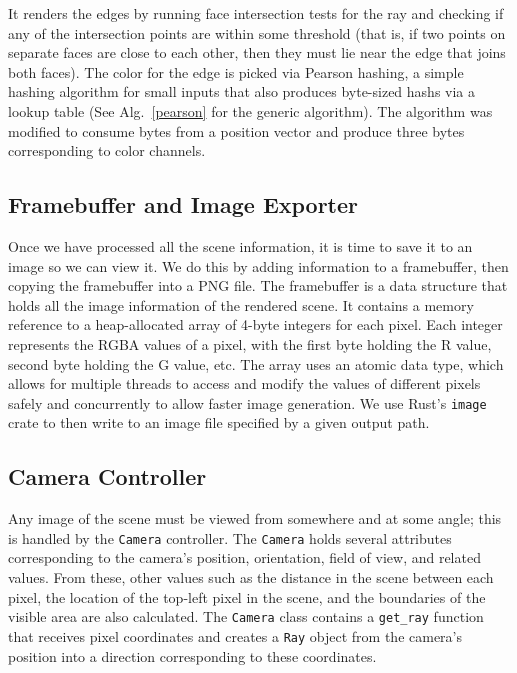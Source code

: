 \documentclass[conference]{IEEEtran}
\begin{document}
It renders the edges by running face intersection tests for the ray and checking if any of the intersection points are within some threshold (that is, if two points on separate faces are close to each other, then they must lie near the edge that joins both faces).
The color for the edge is picked via Pearson hashing, a simple hashing algorithm for small inputs that also produces byte-sized hashs via a lookup table (See Alg.~\ref{pearson} for the generic algorithm).
The algorithm was modified to consume bytes from a position vector and produce three bytes corresponding to color channels.

\subsection{Framebuffer and Image Exporter}

Once we have processed all the scene information, it is time to save it to an image so we can view it.
We do this by adding information to a framebuffer, then copying the framebuffer into a PNG file.
The framebuffer is a data structure that holds all the image information of the rendered scene.
It contains a memory reference to a heap-allocated array of 4-byte integers for each pixel.
Each integer represents the RGBA values of a pixel, with the first byte holding the R value, second byte holding the G value, etc.
The array uses an atomic data type, which allows for multiple threads to access and modify the values of different pixels safely and concurrently to allow faster image generation.
We use Rust’s \verb|image| crate to then write to an image file specified by a given output path.

\subsection{Camera Controller}

Any image of the scene must be viewed from somewhere and at some angle; this is handled by the \texttt{Camera} controller.
The \texttt{Camera} holds several attributes corresponding to the camera's position, orientation, field of view, and related values.
From these, other values such as the distance in the scene between each pixel, the location of the top-left pixel in the scene, and the boundaries of the visible area are also calculated.
The \texttt{Camera} class contains a \texttt{get\_ray} function that receives pixel coordinates and creates a \texttt{Ray} object from the camera's position into a direction corresponding to these coordinates.
\end{document}

